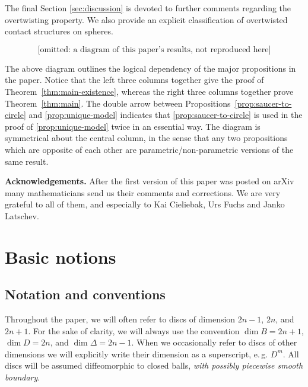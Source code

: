 \documentclass[12pt]{paper}
\theoremstyle{plain}
\theoremstyle{definition}
\numberwithin{figure}{section}
\begin{document}
The final Section \ref{sec:discussion} is devoted to further comments regarding the overtwisting property. We also provide an explicit classification of overtwisted contact structures on spheres.
 
\begin{displaymath}
\mbox{[omitted: a diagram of this paper's results, not reproduced here]}
\end{displaymath} 


 
The above diagram outlines the logical dependency of the major propositions in the paper. Notice that the left three columns together give the proof of Theorem~\ref{thm:main-existence}, whereas the right three columns together prove Theorem~\ref{thm:main}.  The double arrow between Propositions~\ref{prop:saucer-to-circle} and \ref{prop:unique-model} indicates that \ref{prop:saucer-to-circle} is used in the proof of \ref{prop:unique-model}  twice in an essential way. The diagram is symmetrical about the central column, in the sense that any two propositions which are opposite of each other are parametric/non-parametric versions of the same result.


 
 {\bf Acknowledgements.}
 After the first version of this paper was posted on arXiv many mathematicians send us their comments and corrections. We are very grateful to all of them, and  especially  to Kai Cieliebak, Urs Fuchs and Janko Latschev.
 
\section{Basic notions}\label{sec:basic}
 \subsection{Notation and conventions}\label{sec:notation}
Throughout the paper, we will often refer to discs of dimension $2n-1$, $2n$, and $2n+1$. For the sake of clarity, we will always use the convention $\dim B=2n+1$, $\dim D = 2n$, and $\dim \Delta = 2n-1$. When we occasionally refer to discs of other dimensions we will explicitly write their dimension as a superscript, e.\,g. $D^{m}$. All discs will be assumed      diffeomorphic to closed balls, \emph{with possibly piecewise smooth boundary}.  
\end{document}
